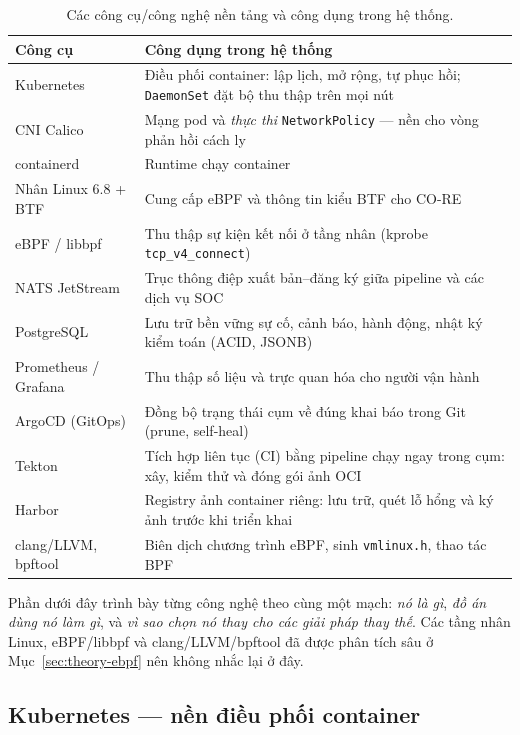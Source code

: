 \begin{table}[H]
  \centering
  \caption{Các công cụ/công nghệ nền tảng và công dụng trong hệ thống.}
  \label{tab:tech}
  \small
  \begin{tabularx}{\linewidth}{@{}l X@{}}
    \toprule
    \textbf{Công cụ} & \textbf{Công dụng trong hệ thống} \\
    \midrule
    Kubernetes              & Điều phối container: lập lịch, mở rộng, tự phục hồi; \texttt{DaemonSet} đặt bộ thu thập trên mọi nút \\
    CNI Calico              & Mạng pod và \emph{thực thi} \texttt{NetworkPolicy} --- nền cho vòng phản hồi cách ly \\
    containerd              & Runtime chạy container \\
    Nhân Linux 6.8 + BTF    & Cung cấp eBPF và thông tin kiểu BTF cho CO-RE \\
    eBPF / libbpf           & Thu thập sự kiện kết nối ở tầng nhân (kprobe \texttt{tcp\_v4\_connect}) \\
    NATS JetStream          & Trục thông điệp xuất bản--đăng ký giữa pipeline và các dịch vụ SOC \\
    PostgreSQL              & Lưu trữ bền vững sự cố, cảnh báo, hành động, nhật ký kiểm toán (ACID, JSONB) \\
    Prometheus / Grafana    & Thu thập số liệu và trực quan hóa cho người vận hành \\
    ArgoCD (GitOps)         & Đồng bộ trạng thái cụm về đúng khai báo trong Git (prune, self-heal) \\
    Tekton                  & Tích hợp liên tục (CI) bằng pipeline chạy ngay trong cụm: xây, kiểm thử và đóng gói ảnh OCI \\
    Harbor                  & Registry ảnh container riêng: lưu trữ, quét lỗ hổng và ký ảnh trước khi triển khai \\
    clang/LLVM, bpftool     & Biên dịch chương trình eBPF, sinh \texttt{vmlinux.h}, thao tác BPF \\
    \bottomrule
  \end{tabularx}
\end{table}

Phần dưới đây trình bày từng công nghệ theo cùng một mạch: \emph{nó là gì}, \emph{đồ án
dùng nó làm gì}, và \emph{vì sao chọn nó thay cho các giải pháp thay thế}. Các tầng nhân
Linux, eBPF/libbpf và clang/LLVM/bpftool đã được phân tích sâu ở Mục~\ref{sec:theory-ebpf}
nên không nhắc lại ở đây.

\subsection{Kubernetes --- nền điều phối container}

